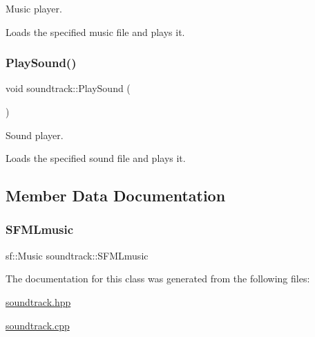 Music player. 

Loads the specified music file and plays it. \mbox{\label{classsoundtrack_a3c86452d68b41eea981d0df4984713e8}} 
\subsubsection{\texorpdfstring{Play\+Sound()}{PlaySound()}}
{\footnotesize\ttfamily void soundtrack\+::\+Play\+Sound (\begin{DoxyParamCaption}{ }\end{DoxyParamCaption})}



Sound player. 

Loads the specified sound file and plays it. 

\subsection{Member Data Documentation}
\mbox{\label{classsoundtrack_ae1db63c6fe8c2f2111c693bd543e921c}} 
\subsubsection{\texorpdfstring{S\+F\+M\+Lmusic}{SFMLmusic}}
{\footnotesize\ttfamily sf\+::\+Music soundtrack\+::\+S\+F\+M\+Lmusic\hspace{0.3cm}{\ttfamily [private]}}



The documentation for this class was generated from the following files\+:\begin{DoxyCompactItemize}
\item 
\hyperlink{soundtrack_8hpp}{soundtrack.\+hpp}\item 
\hyperlink{soundtrack_8cpp}{soundtrack.\+cpp}\end{DoxyCompactItemize}
